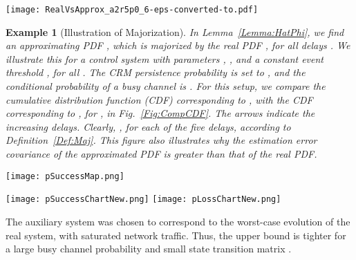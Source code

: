 \documentclass[twocolumn]{autart}
\newtheorem{example}{Example}[section]
\begin{document}
\begin{figure*}[ptb]
\begin{center}
\texttt{[image: RealVsApprox\_a2r5p0\_6-eps-converted-to.pdf]}
\caption{The approximate PDF in Lemma~\ref{Lemma:HatPhi} is majorized by the actual PDF, as seen in this comparison of the CDFs. The approximate distribution has a larger variance, and is an upper bound for the actual variance. }
\label{Fig:CompCDF}
\end{center}
\end{figure*}

\begin{example}[Illustration of Majorization] \label{Ex:MajPDF}
In Lemma~\ref{Lemma:HatPhi}, we find an approximating PDF , which is majorized by the real PDF , for all delays . We illustrate this for a control system with parameters , ,  and a constant event threshold , for all . The CRM persistence probability is set to , and the conditional probability of a busy channel is . For this setup, we compare the cumulative distribution function (CDF) corresponding to , with the CDF corresponding to , for , in Fig.~\ref{Fig:CompCDF}. The arrows indicate the increasing delays. Clearly, , for each of the five delays, according to Definition~\ref{Def:Maj}. This figure also illustrates why the estimation error covariance of the approximated PDF is greater than that of the real PDF.
\end{example}

\begin{figure*}[ptb]
\centering
\texttt{[image: pSuccessMap.png]}
\caption{The shaded region denotes the set of event and persistence probabilities,  and , respectively, that guarantee Lyapunov mean square stability. We use the sufficient conditions in Theorem~\ref{Thm:ConstLaw}, for a constant-probability scheduler, to determine Lyapunov mean square stability. }
\label{Fig:pSuccessMap}
\end{figure*}
\begin{figure*}[ptb]
\texttt{[image: pSuccessChartNew.png]} \hfill
\texttt{[image: pLossChartNew.png]}
\caption{A surface plot of the network reliability , and the probability of loss , respectively, versus the event probability  and the persistence probability , for a constant-probability scheduler. }
\label{Fig:pSuccessLossPlot}\end{figure*}

The auxiliary system was chosen to correspond to the worst-case evolution of the real system, with saturated network traffic. Thus, the upper bound is tighter for a large busy channel probability  and small state transition matrix .
\end{document}

